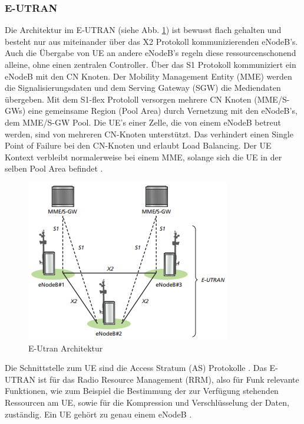 \subsubsection{E-UTRAN}
\label{subsubsec:eutran}
Die Architektur im E-UTRAN (siehe Abb. \ref{fig:eutranarchitektur}) ist bewusst flach gehalten und besteht nur aus miteinander über das X2 Protokoll kommunizierenden eNodeB's. Auch die Übergabe von UE an andere eNodeB's regeln diese ressourcenschonend alleine, ohne einen zentralen Controller. Über das S1 Protokoll kommuniziert ein eNodeB mit den CN Knoten. Der Mobility Management Entity (MME) werden die Signalisierungsdaten und dem Serving Gateway (SGW) die Mediendaten übergeben. Mit dem S1-flex Protololl versorgen mehrere CN Knoten (MME/S-GWs) eine gemeinsame Region (Pool Area) durch Vernetzung mit den eNodeB's, dem MME/S-GW Pool. Die UE's einer Zelle, die von einem eNodeB betreut werden, sind von mehreren CN-Knoten unterstützt. Das verhindert einen Single Point of Failure bei den CN-Knoten und erlaubt Load Balancing. Der UE Kontext verbleibt normalerweise bei einem MME, solange sich die UE in der selben Pool Area befindet \cite{Ses11}.
\begin{figure}[H]
	\centering
	\includegraphics[width=1\linewidth]{images/E_UTRAN_Architektur}
	\caption[]{E-Utran Architektur \protect\cite{Ses11}}
	\label{fig:eutranarchitektur}
\end{figure}
Die Schnittstelle zum UE sind die Access Stratum (AS) Protokolle \cite[S. 131]{Sau06}. Das E-UTRAN ist für das Radio Resource Management (RRM), also für Funk relevante Funktionen, wie zum Beispiel die Bestimmung der zur Verfügung stehenden Ressourcen  am UE, sowie für die Kompression und Verschlüsselung der Daten, zuständig. Ein UE gehört zu genau einem eNodeB \cite{Ses11}.
